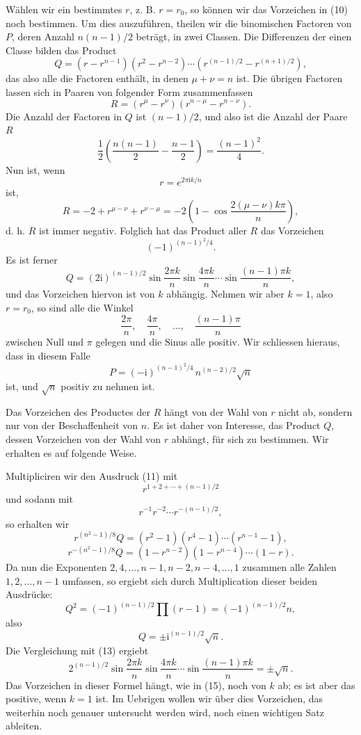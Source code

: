 \documentclass[11pt]{article}
\providecommand{\ii}{\mathrm{i}}
\begin{document}
Wählen wir ein bestimmtes $r$, z. B. $r=r_0$, so können wir das Vorzeichen in (10) noch bestimmen. Um dies auszuführen, theilen wir die binomischen Factoren von $P$, deren Anzahl $n(n-1)/2$ beträgt, in zwei Classen. Die Differenzen der einen Classe bilden das Product
\[
\tag{11}       Q=(r-r^{n-1})(r^2-r^{n-2})\cdots\left(r^{(n-1)/2}-r^{(n+1)/2}\right),
\]
das also alle die Factoren enthält, in denen $\mu+\nu=n$ ist. Die übrigen Factoren lassen sich in Paaren von folgender Form zusammenfassen
\[
\tag{12}       R=(r^\mu-r^\nu)(r^{n-\mu}-r^{n-\nu}).
\]
Die Anzahl der Factoren in $Q$ ist $(n-1)/2$, und also ist die Anzahl der Paare $R$
\[
        \frac12\left(\frac{n(n-1)}2-\frac{n-1}2\right)=\frac{(n-1)^2}{4}.
\]
Nun ist, wenn
\[
        r=e^{2\pi \ii k/n}
\]
ist,
\[
        R=-2+r^{\mu-\nu}+r^{\nu-\mu}=-2\left(1-\cos\frac{2(\mu-\nu)k\pi}{n}\right),
\]
d. h. $R$ ist immer negativ. Folglich hat das Product aller $R$ das Vorzeichen
\[
        (-1)^{(n-1)^2/4}.
\]
Es ist ferner
\[
\tag{13}       Q=(2\ii)^{(n-1)/2}\sin\frac{2\pi k}{n}\sin\frac{4\pi k}{n}\cdots\sin\frac{(n-1)\pi k}{n},
\]
und das Vorzeichen hiervon ist von $k$ abhängig. Nehmen wir aber $k=1$, also $r=r_0$, so sind alle die Winkel
\[
        \frac{2\pi}{n},\quad \frac{4\pi}{n},\quad\ldots,\quad \frac{(n-1)\pi}{n}
\]
zwischen Null und $\pi$ gelegen und die Sinus alle positiv. Wir schliessen hieraus, dass in diesem Falle
\[
\tag{14}       P=(-\ii)^{(n-1)^2/4}\, n^{(n-2)/2}\sqrt n
\]
ist, und $\sqrt n$ positiv zu nehmen ist.

Das Vorzeichen des Productes der $R$ hängt von der Wahl von $r$ nicht ab, sondern nur von der Beschaffenheit von $n$. Es ist daher von Interesse, das Product $Q$, dessen Vorzeichen von der Wahl von $r$ abhängt, für sich zu bestimmen. Wir erhalten es auf folgende Weise.

Multipliciren wir den Ausdruck (11) mit
\[
        r^{1+2+\cdots+(n-1)/2}
\]
und sodann mit
\[
        r^{-1}r^{-2}\cdots r^{-(n-1)/2},
\]
so erhalten wir
\[
        r^{(n^2-1)/8}Q=(r^2-1)(r^4-1)\cdots(r^{n-1}-1),
\]
\[
        r^{-(n^2-1)/8}Q=(1-r^{n-2})(1-r^{n-4})\cdots(1-r).
\]
Da nun die Exponenten $2,4,\ldots,n-1,n-2,n-4,\ldots,1$ zusammen alle Zahlen $1,2,\ldots,n-1$ umfassen, so ergiebt sich durch Multiplication dieser beiden Ausdrücke:
\[
        Q^2=(-1)^{(n-1)/2}\prod(r-1)=(-1)^{(n-1)/2}n,
\]
also
\[
\tag{15}       Q=\pm \ii^{(n-1)/2}\sqrt n.
\]
Die Vergleichung mit (13) ergiebt
\[
\tag{16}       2^{(n-1)/2}\sin\frac{2\pi k}{n}\sin\frac{4\pi k}{n}\cdots\sin\frac{(n-1)\pi k}{n}=\pm\sqrt n.
\]
Das Vorzeichen in dieser Formel hängt, wie in (15), noch von $k$ ab; es ist aber das positive, wenn $k=1$ ist. Im Uebrigen wollen wir über dies Vorzeichen, das weiterhin noch genauer untersucht werden wird, noch einen wichtigen Satz ableiten.
\end{document}

